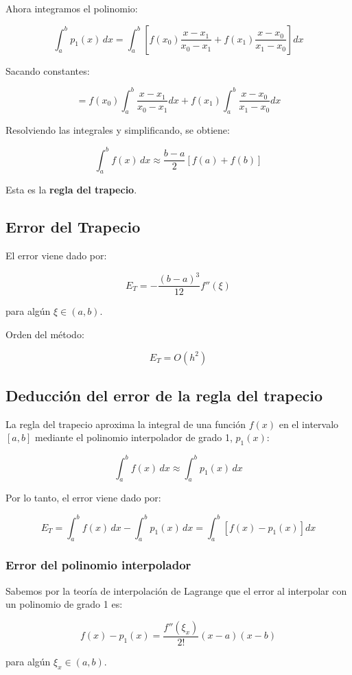 \documentclass[12pt,a4paper]{article}
\begin{document}
Ahora integramos el polinomio:

\[
\int_a^b p_1(x)\,dx
=
\int_a^b
\left[
f(x_0)\frac{x - x_1}{x_0 - x_1}
+ f(x_1)\frac{x - x_0}{x_1 - x_0}
\right] dx
\]

Sacando constantes:

\[
=
f(x_0)\int_a^b \frac{x - x_1}{x_0 - x_1} dx
+
f(x_1)\int_a^b \frac{x - x_0}{x_1 - x_0} dx
\]

Resolviendo las integrales y simplificando, se obtiene:

\[
\int_a^b f(x)\,dx \approx \frac{b-a}{2}\left[f(a) + f(b)\right]
\]

Esta es la \textbf{regla del trapecio}.


\subsection{Error del Trapecio}

El error viene dado por:

\[
E_T = -\frac{(b-a)^3}{12} f''(\xi)
\]

para algún $\xi \in (a,b)$.

Orden del método:

\[
E_T = O(h^2)
\]


\subsection{Deducción del error de la regla del trapecio}

La regla del trapecio aproxima la integral de una función $f(x)$ en el intervalo $[a,b]$ 
mediante el polinomio interpolador de grado 1, $p_1(x)$:

\[
\int_a^b f(x)\,dx \approx \int_a^b p_1(x)\,dx
\]

Por lo tanto, el error viene dado por:

\[
E_T = \int_a^b f(x)\,dx - \int_a^b p_1(x)\,dx
= \int_a^b \left[f(x) - p_1(x)\right] dx
\]

\subsubsection*{Error del polinomio interpolador}

Sabemos por la teoría de interpolación de Lagrange que el error al interpolar con un 
polinomio de grado 1 es:

\[
f(x) - p_1(x) = \frac{f''(\xi_x)}{2!}(x-a)(x-b)
\]

para algún $\xi_x \in (a,b)$.
\end{document}
